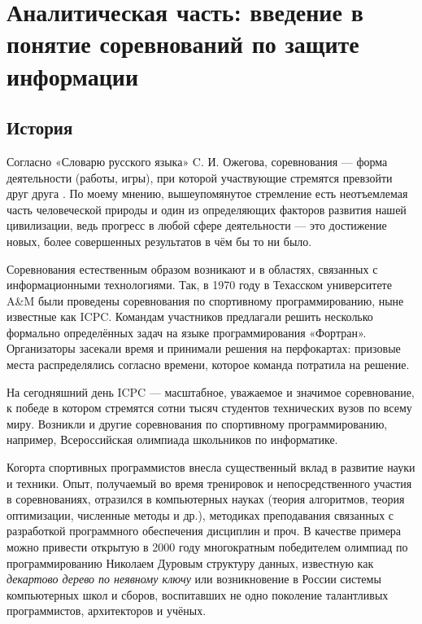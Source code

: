 \chapter{Аналитическая часть: введение в понятие соревнований по защите информации}
\label{cha:analysis}

\section{История}

Согласно «Словарю русского языка» C. И. Ожегова, соревнования --- форма деятельности (работы, игры), при которой участвующие стремятся превзойти друг друга \cite{Ozhegov89}. По моему мнению, вышеупомянутое стремление есть неотъемлемая часть человеческой природы и один из определяющих факторов развития нашей цивилизации, ведь прогресс в любой сфере деятельности --- это достижение новых, более совершенных результатов в чём бы то ни было.


Соревнования естественным образом возникают и в областях, связанных с информационными технологиями. Так, в 1970 году в Техасском университете A\&M были проведены соревнования по спортивному программированию, ныне известные как ICPC\cite{AboutICPC}. Командам участников предлагали решить несколько формально определённых задач на языке программирования «Фортран». Организаторы засекали время и принимали решения на перфокартах: призовые места распределялись согласно времени, которое команда потратила на решение.

На сегодняшний день ICPC — масштабное, уважаемое и значимое соревнование, к победе в котором стремятся сотни тысяч студентов технических вузов по всему миру. Возникли и другие соревнования по спортивному программированию, например, Всероссийская олимпиада школьников по информатике.

Когорта спортивных программистов внесла существенный вклад в развитие науки и техники. Опыт, получаемый во время тренировок и непосредственного участия в соревнованиях, отразился в компьютерных науках (теория алгоритмов, теория оптимизации, численные методы и др.), методиках преподавания связанных с разработкой программного обеспечения дисциплин и проч. В качестве примера можно привести открытую в 2000 году многократным победителем олимпиад по программированию Николаем Дуровым структуру данных, известную как \textit{декартово дерево по неявному ключу}\cite{Durov00} или возникновение в России системы компьютерных школ и сборов, воспитавших не одно поколение талантливых программистов, архитекторов и учёных\cite{Netrusova09}\cite{Kraivanova12}.

